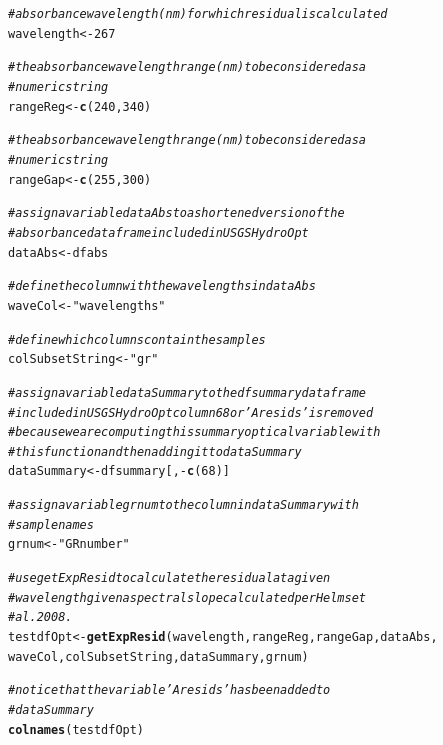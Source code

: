 \documentclass[a4paper,11pt]{article}\usepackage[]{graphicx}\usepackage[]{color}
\makeatletter
\newcommand{\hlnum}[1]{\textcolor[rgb]{0.686,0.059,0.569}{#1}}%
\newcommand{\hlstr}[1]{\textcolor[rgb]{0.192,0.494,0.8}{#1}}%
\newcommand{\hlcom}[1]{\textcolor[rgb]{0.678,0.584,0.686}{\textit{#1}}}%
\newcommand{\hlopt}[1]{\textcolor[rgb]{0,0,0}{#1}}%
\newcommand{\hlstd}[1]{\textcolor[rgb]{0.345,0.345,0.345}{#1}}%
\newcommand{\hlkwb}[1]{\textcolor[rgb]{0.69,0.353,0.396}{#1}}%
\newcommand{\hlkwd}[1]{\textcolor[rgb]{0.737,0.353,0.396}{\textbf{#1}}}%
\newenvironment{kframe}{%
 \def\at@end@of@kframe{}%
 \ifinner\ifhmode%
  \def\at@end@of@kframe{\end{minipage}}%
  \begin{minipage}{\columnwidth}%
 \fi\fi%
 \def\FrameCommand##1{\hskip\@totalleftmargin \hskip-\fboxsep
 \colorbox{shadecolor}{##1}\hskip-\fboxsep
     \hskip-\linewidth \hskip-\@totalleftmargin \hskip\columnwidth}%
 \MakeFramed {\advance\hsize-\width
   \@totalleftmargin\z@ \linewidth\hsize
   \@setminipage}}%
 {\par\unskip\endMakeFramed%
 \at@end@of@kframe}
\newenvironment{knitrout}{}{} %
\makeatother
\begin{document}
\begin{knitrout}
\color{fgcolor}\begin{kframe}
\begin{alltt}
\hlcom{# absorbance wavelength (nm) for which residual is calculated}
\hlstd{wavelength} \hlkwb{<-} \hlnum{267}

\hlcom{# the absorbance wavelength range (nm) to be considered as a}
\hlcom{# numeric string}
\hlstd{rangeReg} \hlkwb{<-} \hlkwd{c}\hlstd{(}\hlnum{240}\hlstd{,} \hlnum{340}\hlstd{)}

\hlcom{# the absorbance wavelength range (nm) to be considered as a}
\hlcom{# numeric string}
\hlstd{rangeGap} \hlkwb{<-} \hlkwd{c}\hlstd{(}\hlnum{255}\hlstd{,} \hlnum{300}\hlstd{)}

\hlcom{# assign a variable dataAbs to a shortened version of the}
\hlcom{# absorbance dataframe included in USGSHydroOpt}
\hlstd{dataAbs} \hlkwb{<-} \hlstd{dfabs}

\hlcom{# define the column with the wavelengths in dataAbs}
\hlstd{waveCol} \hlkwb{<-} \hlstr{"wavelengths"}

\hlcom{# define which columns contain the samples}
\hlstd{colSubsetString} \hlkwb{<-} \hlstr{"gr"}

\hlcom{# assign a variable dataSummary to the dfsummary dataframe}
\hlcom{# included in USGSHydroOpt column 68 or 'Aresids' is removed}
\hlcom{# because we are computing this summary optical variable with}
\hlcom{# this function and then adding it to dataSummary}
\hlstd{dataSummary} \hlkwb{<-} \hlstd{dfsummary[,} \hlopt{-}\hlkwd{c}\hlstd{(}\hlnum{68}\hlstd{)]}

\hlcom{# assign a variable grnum to the column in dataSummary with}
\hlcom{# sample names}
\hlstd{grnum} \hlkwb{<-} \hlstr{"GRnumber"}

\hlcom{# use getExpResid to calculate the residual at a given}
\hlcom{# wavelength given a spectral slope calculated per Helms et}
\hlcom{# al. 2008.}
\hlstd{testdfOpt} \hlkwb{<-} \hlkwd{getExpResid}\hlstd{(wavelength, rangeReg, rangeGap, dataAbs,}
    \hlstd{waveCol, colSubsetString, dataSummary, grnum)}

\hlcom{# notice that the variable 'Aresids' has been added to}
\hlcom{# dataSummary}
\hlkwd{colnames}\hlstd{(testdfOpt)}
\end{alltt}
\end{kframe}
\end{knitrout}

\end{document}
